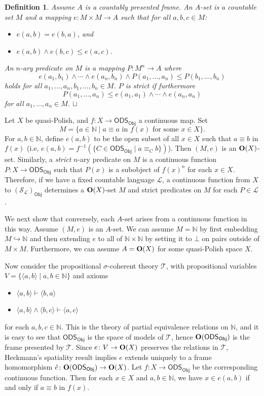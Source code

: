 \documentclass{article}
\theoremstyle{plain}
\newtheorem{definition}[Theorem]{Definition}
\def\squareforqed{\hbox{\rlap{$\sqcap$}$\sqcup$}}
\def\qed{\ifmmode\squareforqed\else{\unskip\nobreak\hfil
\penalty50\hskip1em\null\nobreak\hfil\squareforqed
\parfillskip=0pt\finalhyphendemerits=0\endgraf}\fi}
\def\cal#1{{\mathcal #1}}
\def\IN{{\mathbb N}}
\def\PO{{\mathrm{\bold O}}}
\def\calL{{\cal L}}
\def\calS{{\cal S}}
\def\calT{{\cal T}}
\newcommand{\ODS}{{\mathsf{ODS}}}
\newcommand{\Obj}{\mathsf{Obj}}
\begin{document}
\begin{definition}
Assume $A$ is a countably presented frame. An $A$-set is a countable set $M$ and a mapping $e\colon M\times M \to A$ such that for all $a,b,c\in M$:
\begin{itemize}
\item
$e(a,b)=e(b,a)$, and
\item
$e(a,b)\wedge e(b,c) \leq e(a,c)$.
\end{itemize}
An $n$-ary predicate on $M$ is a mapping $P\colon M^n\to A$ where
\[e(a_1,b_1)\wedge\cdots\wedge e(a_n,b_n)\wedge P(a_1,\ldots,a_n)\leq P(b_1,\ldots,b_n)\]
holds for all $a_1,\ldots,a_n,b_1,\ldots,b_n\in M$. $P$ is \emph{strict} if furthermore
\[P(a_1,\ldots,a_n) \leq e(a_1,a_1)\wedge\cdots\wedge e(a_n,a_n)\]
for all $a_1,\ldots,a_n\in M$.
\qed
\end{definition}

Let $X$ be quasi-Polish, and $f\colon X\to\ODS_\Obj$ a continuous map. Set 
\[M=\{a\in\IN \mid \text{$a\equiv a$ in $f(x)$ for some $x\in X$}\}.\]
For $a,b\in\IN$, define $e(a,b)$ to be the open subset of all $x\in X$  such that $a\equiv b$ in $f(x)$ (i.e, $e(a,b) = f^{-1}(\{ C\in\ODS_\Obj \mid a \equiv_C b\})$). Then $(M,e)$ is an $\PO(X)$-set. Similarly, a \emph{strict} $n$-ary predicate on $M$ is a continuous function $P\colon X\to\ODS_\Obj$ such that $P(x)$ is a subobject of $f(x)^n$ for each $x\in X$. Therefore, if we have a fixed countable language $\calL$, a continuous function from $X$ to $(\calS_\calL)_\Obj$ determines a $\PO(X)$-set $M$ and strict predicates on $M$ for each $P\in\calL$.

We next show that conversely, each $A$-set arises from a continuous function in this way. Assume $(M,e)$ is an $A$-set. We can assume $M= \IN$ by first embedding $M\hookrightarrow \IN$ and then extending $e$ to all of $\IN\times\IN$ by setting it to $\bot$ on pairs outside of $M\times M$. Furthermore, we can assume $A=\PO(X)$ for some quasi-Polish space $X$.

Now consider the propositional $\sigma$-coherent theory $\calT$, with propositional variables $V=\{\langle a,b\rangle \mid a,b\in\IN\}$ and axioms
\begin{itemize}
\item
$\langle a,b\rangle \vdash \langle b,a\rangle$
\item
$\langle a,b\rangle \wedge \langle b,c\rangle \vdash \langle a,c\rangle$
\end{itemize}
for each $a,b,c\in\IN$. This is the theory of partial equivalence relations on $\IN$, and it is easy to see that $\ODS_\Obj$ is the space of models of $\calT$, hence $\PO(\ODS_\Obj)$ is the frame presented by $\calT$. Since $e\colon V \to \PO(X)$ preserves the relations in $\calT$, Heckmann's spatiality result implies $e$ extends uniquely to a frame homomorphism $\hat{e}\colon\PO(\ODS_\Obj) \to \PO(X)$. Let $f\colon X\to\ODS_\Obj$ be the corresponding continuous function. Then for each $x\in X$ and $a,b\in\IN$, we have $x\in e(a,b)$ if and only if $a\equiv b$ in $f(x)$.
\end{document}
